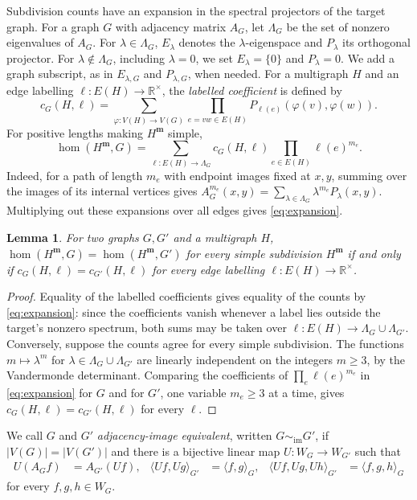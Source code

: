 \documentclass[10pt,a4paper]{article}
\theoremstyle{plain}
\newtheorem{lemma}[theorem]{Lemma}
\theoremstyle{definition}
\newcommand{\R}{\mathbb{R}}
\begin{document}
Subdivision counts have an expansion in the spectral projectors of the target graph.
For a graph $G$ with adjacency matrix $A_G$, let $\Lambda_G$ be the set of
nonzero eigenvalues of $A_G$.
For $\lambda\in\Lambda_G$, $E_\lambda$ denotes the
$\lambda$-eigenspace and $P_\lambda$ its orthogonal projector.
For $\lambda\notin\Lambda_G$, including $\lambda=0$, we set
$E_\lambda=\{0\}$ and $P_\lambda=0$.
We add a graph subscript, as in $E_{\lambda,G}$ and $P_{\lambda,G}$,
when needed. For a multigraph $H$ and an edge labelling
$\ell:E(H)\to\R^\times$, the \emph{labelled coefficient} is
defined by
\begin{equation}\label{eq:contraction}
 c_G(H,\ell)=\sum_{\varphi:V(H)\to V(G)}
    \prod_{e=vw\in E(H)}P_{\ell(e)}(\varphi(v),\varphi(w)).
\end{equation}
For positive lengths making $H^{\mathbf m}$ simple,
\begin{equation}\label{eq:expansion}
 \hom(H^{\mathbf m},G)=\sum_{\ell:E(H)\to\Lambda_G}
       c_G(H,\ell)\prod_{e\in E(H)}\ell(e)^{m_e}.
\end{equation}
Indeed, for a path of length $m_e$ with endpoint images fixed at $x,y$,
summing over the images of its internal vertices gives
$A_G^{m_e}(x,y)=\sum_{\lambda\in\Lambda_G}\lambda^{m_e}P_\lambda(x,y)$.
Multiplying out these expansions over all edges gives \cref{eq:expansion}.
\begin{lemma}\label{lem:subdivision-coefficients}
For two graphs $G,G'$ and a multigraph $H$,
$\hom(H^{\mathbf m},G)=\hom(H^{\mathbf m},G')$ for every simple
subdivision $H^{\mathbf m}$ if and only if $c_G(H,\ell)=c_{G'}(H,\ell)$
for every edge labelling $\ell:E(H)\to\R^\times$.
\end{lemma}
\begin{proof}
Equality of the labelled coefficients gives equality of the counts by
\cref{eq:expansion}: since the coefficients vanish whenever a label
lies outside the target's nonzero spectrum, both sums may be taken over
$\ell:E(H)\to\Lambda_G\cup\Lambda_{G'}$.
Conversely, suppose the counts agree for every simple subdivision.
The functions $m\mapsto\lambda^m$ for
$\lambda\in\Lambda_G\cup\Lambda_{G'}$ are linearly independent on the
integers $m\geq3$, by the Vandermonde determinant.
Comparing the coefficients of $\prod_e\ell(e)^{m_e}$ in
\cref{eq:expansion} for $G$ and for $G'$, one variable $m_e\geq3$ at a time,
gives
$c_G(H,\ell)=c_{G'}(H,\ell)$ for every $\ell$.
\end{proof}

We call $G$ and $G'$ \emph{adjacency-image equivalent}, written
$G\sim_{\mathrm{im}}G'$, if $|V(G)|=|V(G')|$ and
there is a bijective linear map $U:W_G\to W_{G'}$ such that
\begin{equation}\label{eq:adjacency-image-equivalence}
 \begin{aligned}
 U(A_Gf)&=A_{G'}(Uf), &
 \langle Uf,Ug\rangle_{G'}&=\langle f,g\rangle_G, &
 \langle Uf,Ug,Uh\rangle_{G'}&=\langle f,g,h\rangle_G
 \end{aligned}
\end{equation}
for every $f,g,h\in W_G$.
\end{document}
